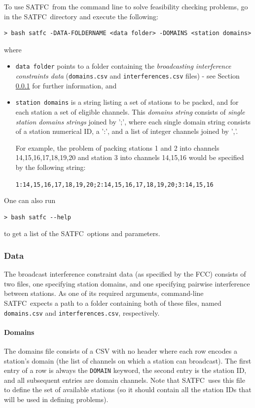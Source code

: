 \documentclass[
10pt, %
letterpaper, %
oneside, %
headinclude,footinclude, %
BCOR5mm, %
needspace, %
]{scrartcl}
\newcommand{\SATFC}{\textsc{SATFC}~}
\begin{document}
To use \SATFC from the command line to solve feasibility checking problems, go in the \SATFC directory and execute the following:
\begin{lstlisting}[style=Bash]
> bash satfc -DATA-FOLDERNAME <data folder> -DOMAINS <station domains>
\end{lstlisting}
where 
\begin{itemize}
\item \texttt{data folder} points to a folder containing the \emph{broadcasting interference constraints data} (\texttt{domains.csv} and \texttt{interferences.csv} files) - see Section \ref{sec:data} for further information, and
\item \texttt{station domains} is a string listing a set of stations to be packed, and for each station a set of eligible channels. This \emph{domains string} consists of \emph{single station domains strings} joined by ';', where each single domain string consists of a station numerical ID, a ':', and a list of integer channels joined by ','. 

For example, the problem of packing stations 1 and 2 into channels 14,15,16,17,18,19,20 and station 3 into channels 14,15,16 would be specified by the following string:
\begin{center}
\texttt{1:14,15,16,17,18,19,20;2:14,15,16,17,18,19,20;3:14,15,16}
\end{center}
\end{itemize}
One can also run
\begin{lstlisting}[style=Bash]
> bash satfc --help
\end{lstlisting}
to get a list of the \SATFC options and parameters.

\subsubsection{Data}\label{sec:data}

The broadcast interference constraint data (as specified by the FCC) consists of two files, one specifying station domains, and one specifying pairwise interference between stations. As one of its required arguments, command-line \SATFC expects a path to a folder containing both of these files, named \texttt{domains.csv} and \texttt{interferences.csv}, respectively.

\paragraph{Domains} The domains file consists of a CSV with no header where each row encodes a station's domain (the list of channels on which a station can broadcast). The first entry of a row is always the \texttt{DOMAIN} keyword, the second entry is the station ID, and all subsequent entries are domain channels. Note that \SATFC uses this file to define the set of available stations (so it should contain all the station IDs that will be used in defining problems).
\end{document}
